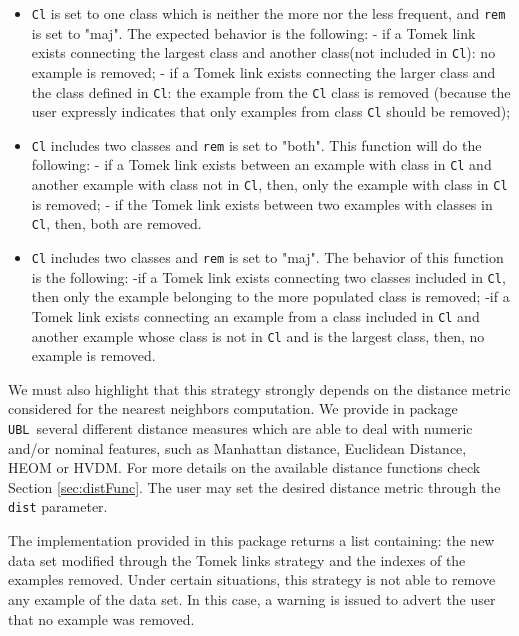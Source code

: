 \documentclass[10pt,a4paper]{article}\usepackage[]{graphicx}\usepackage[]{color}
\newcommand{\UBL}{package \texttt{UBL}\ }
\begin{document}
\begin{itemize}
\item \texttt{Cl} is set to one class which is neither the more nor the less frequent, and \texttt{rem} is set to "maj". The expected behavior is the following:
- if a Tomek link exists connecting the largest class and another class(not included in \texttt{Cl}): no example is removed;
- if a Tomek link exists connecting the larger class and the class defined in \texttt{Cl}: the example from the \texttt{Cl} class is removed (because the user expressly indicates that only examples from class \texttt{Cl} should be removed);

\item \texttt{Cl} includes two classes and \texttt{rem} is set to "both". This function will do the following:
- if a Tomek link exists between an example with class in \texttt{Cl} and another example with class not in \texttt{Cl}, then, only the example with class in \texttt{Cl} is removed;
- if the Tomek link exists between two examples with classes in \texttt{Cl}, then, both are removed.

\item \texttt{Cl} includes two classes and \texttt{rem} is set to "maj". The behavior of this function is the following:
-if a Tomek link exists connecting two classes included in \texttt{Cl}, then only the example belonging to the more populated class is removed;
-if a Tomek link exists connecting an example from a class included in \texttt{Cl} and another example whose class is not in \texttt{Cl} and is the largest class, then, no example is removed.

\end{itemize}


We must also highlight that this strategy strongly depends on the distance metric considered for the nearest neighbors computation. We provide in \UBL several different distance measures which are able to deal with numeric and/or nominal features, such as Manhattan distance, Euclidean Distance, HEOM or HVDM. For more details on the available distance functions check Section \ref{sec:distFunc}. The user may set the desired distance metric through the \texttt{dist} parameter.


The implementation provided in this package returns a list containing: the new data set modified through the Tomek links strategy and the indexes of the examples removed. Under certain situations, this strategy is not able to remove any example of the data set. In this case, a warning is issued to advert the user that no example was removed.
\end{document}
